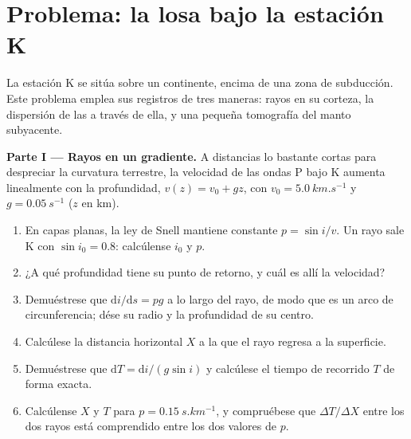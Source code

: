 \section{Problema: la losa bajo la estación K}

\begin{problem}
\label{pb:b3:seismology-imaging:1}
La estación K se sitúa sobre un continente, encima de una zona de subducción. Este problema emplea sus
registros de tres maneras: rayos en su corteza, la dispersión de las  a través de ella,
y una pequeña tomografía del manto subyacente.

\medskip
\noindent\textbf{Parte I --- Rayos en un gradiente.} A distancias lo bastante cortas para despreciar la curvatura terrestre,
la velocidad de las ondas P bajo K aumenta linealmente con la profundidad,
$v(z) = v_0 + gz$, con $v_0 = \qty{5.0}{km.s^{-1}}$ y
$g = \qty{0.05}{s^{-1}}$ ($z$ en km).
\begin{enumerate}
  \item En capas planas, la ley de Snell mantiene constante $p = \sin i/v$. Un rayo sale
        K con $\sin i_0 = 0.8$: calcúlense $i_0$ y $p$.
  \item ¿A qué profundidad tiene su punto de retorno, y cuál es allí la velocidad?
  \item Demuéstrese que $\mathrm di/\mathrm ds = pg$ a lo largo del rayo, de modo que es un
        arco de circunferencia; dése su radio y la profundidad de su centro.
  \item Calcúlese la distancia horizontal $X$ a la que el rayo regresa a la
        superficie.
  \item Demuéstrese que $\mathrm dT = \mathrm di/(g\sin i)$ y calcúlese el tiempo de
        recorrido $T$ de forma exacta.
  \item Calcúlense $X$ y $T$ para $p = \qty{0.15}{s.km^{-1}}$, y compruébese que
        $\Delta T/\Delta X$ entre los dos rayos está comprendido entre los dos valores
        de $p$.
\end{enumerate}


\end{problem}
